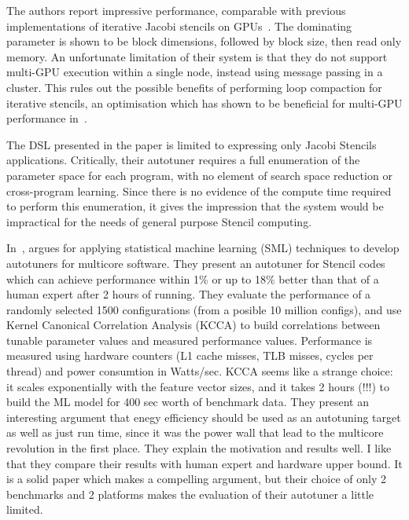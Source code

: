 The authors report impressive performance, comparable with previous
implementations of iterative Jacobi stencils on
GPUs~\cite{Holewinski2012,Phillips2010}. The dominating parameter is
shown to be block dimensions, followed by block size, then read only
memory. An unfortunate limitation of their system is that they do not
support multi-GPU execution within a single node, instead using
message passing in a cluster. This rules out the possible benefits of
performing loop compaction for iterative stencils, an optimisation
which has shown to be beneficial for multi-GPU performance
in~\cite{Lutz2013}.

The DSL presented in the paper is limited to expressing only Jacobi
Stencils applications. Critically, their autotuner requires a full
enumeration of the parameter space for each program, with no element
of search space reduction or cross-program learning. Since there is no
evidence of the compute time required to perform this enumeration, it
gives the impression that the system would be impractical for the
needs of general purpose Stencil
computing.

In~\cite{Ganapathi2009}, \citeauthor{Ganapathi2009} argues for
applying statistical machine learning (SML) techniques to develop
autotuners for multicore software. They present an autotuner for
Stencil codes which can achieve performance within 1\% or up to 18\%
better than that of a human expert after 2 hours of running. They
evaluate the performance of a randomly selected 1500 configurations
(from a posible 10 million configs), and use Kernel Canonical
Correlation Analysis (KCCA) to build correlations between tunable
parameter values and measured performance values. Performance is
measured using hardware counters (L1 cache misses, TLB misses, cycles
per thread) and power consumtion in Watts/sec. KCCA seems like a
strange choice: it scales exponentially with the feature vector sizes,
and it takes 2 hours (!!!) to build the ML model for 400 sec worth of
benchmark data. They present an interesting argument that enegy
efficiency should be used as an autotuning target as well as just run
time, since it was the power wall that lead to the multicore
revolution in the first place. They explain the motivation and results
well. I like that they compare their results with human expert and
hardware upper bound. It is a solid paper which makes a compelling
argument, but their choice of only 2 benchmarks and 2 platforms makes
the evaluation of their autotuner a little limited.

